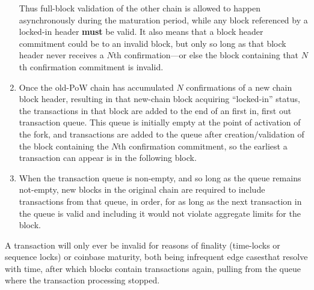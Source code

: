 \begin{enumerate}
Thus full-block validation of the other chain is allowed to happen
asynchronously during the maturation period, while any block
referenced by a locked-in header \textbf{must} be valid.  It also
means that a block header commitment could be to an invalid block, but
only so long as that block header never receives a $N$th
confirmation---or else the block containing that $N$th confirmation
commitment is invalid.

  \item
    Once the old-PoW chain has accumulated $N$ confirmations of a new
    chain block header, resulting in that new-chain block acquiring
    ``locked-in'' status, the transactions in that block are added to
    the end of an first in, first out transaction queue.  This queue
    is initially empty at the point of activation of the fork, and
    transactions are added to the queue after creation/validation of
    the block containing the $N$th confirmation commitment, so the
    earliest a transaction can appear is in the following block.

  \item
    When the transaction queue is non-empty, and so long as the queue
    remains not-empty, new blocks in the original chain are required
    to include transactions from that queue, in order, for as long as
    the next transaction in the queue is valid and including it would
    not violate aggregate limits for the block.
\end{enumerate}

A transaction will only ever be invalid for reasons of finality
(time-locks or sequence locks) or coinbase maturity, both being
infrequent edge cases\footnotemark that resolve with time, after which
blocks contain transactions again, pulling from the queue where the
transaction processing stopped.


